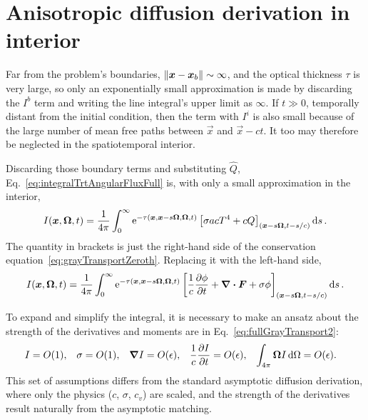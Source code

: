\section{Anisotropic diffusion derivation in interior}
Far from the problem's boundaries, $\left\| \bm{x} - \bm{x}_b \right\| \sim \infty$,
and the optical thickness $\tau$ is very large, so only an exponentially small
approximation is made by discarding the $I^b$ term and writing the line
integral's upper limit as $\infty$. If $t\gg 0$, temporally distant from the
initial condition, then the term with $I^i$ is also small because of the large
number of mean free paths between $\vec{x}$ and $\vec{x} - c t$. It too may
therefore be neglected in the spatiotemporal interior.

Discarding those boundary terms and substituting $\hat Q$, Eq.~\eqref{eq:integralTrtAngularFluxFull} is, with only a small
approximation in the interior,
\begin{equation*}
    I(\bm{x}, \bm{\Omega}, t)
    = \frac{1}{4\pi}\int_{0}^{\infty}
    \mathop{}\!\mathrm{e}^{ -\tau(\bm{x}, \bm{x} - s \bm{\Omega}, \bm{\Omega}, t)}
    \left[ \sigma a c T^4 + c Q \right]_{(\bm{x} - s
    \bm{\Omega}, t-s/c)} \mathop{}\!\mathrm{d} s\,.
\end{equation*}
The quantity in brackets is just the right-hand side of the conservation
equation~\eqref{eq:grayTransportZeroth}. Replacing it with the left-hand
side,
\begin{equation}\label{eq:integralTrtLhs}
    I(\bm{x}, \bm{\Omega}, t)
    = \frac{1}{4\pi}\int_{0}^{\infty}
    \mathop{}\!\mathrm{e}^{ -\tau(\bm{x}, \bm{x} - s \bm{\Omega}, \bm{\Omega}, t)}
    \left[ \frac{1}{c} \frac{\partial \phi}{\partial t} +\bm{\nabla} \bm{\cdot} \bm{F} + \sigma \phi
    \right]_{(\bm{x} - s \bm{\Omega}, t-s/c)} \mathop{}\!\mathrm{d} s\,.
\end{equation}

To expand and simplify the integral, it is necessary to make an ansatz about
the strength of the derivatives and moments are in
Eq.~\eqref{eq:fullGrayTransport2}:
\begin{align*}
  I &= O(1), &
  \sigma &= O(1), &
  \bm{\nabla} I &= O(\epsilon), &
  \frac1c\frac{\partial I}{\partial t} &= O(\epsilon), &
  \int_{4\pi} \bm{\Omega} I\mathop{}\!\mathrm{d} \Omega &= O(\epsilon).
\end{align*}
This set of assumptions differs from the standard asymptotic diffusion
derivation, where only the physics ($c$, $\sigma$, $c_v$) are scaled, and the
strength of the derivatives result naturally from the asymptotic matching.

